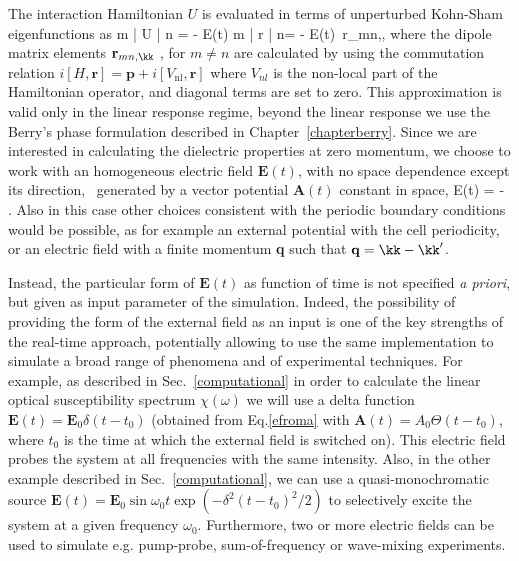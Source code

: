 The interaction Hamiltonian $U$ is evaluated in terms of
unperturbed Kohn-Sham eigenfunctions as
\be
\langle m \kk | U | n \kk \rangle = - \mathbf E(t) \langle m \kk | \mathbf r |
n\kk \rangle =  - \mathbf E(t)\,  \mathbf r_{mn,\kk},
\label{u_expantion}
\ee
where the dipole matrix elements $\mathbf r_{mn,\kk}$ , for $m \neq n$ are calculated by using the
commutation relation $i[H,\mathbf r] = \mathbf p + i[V_{\text{nl}},\mathbf
  r]$ where $V_{nl}$ is the non-local part of the Hamiltonian operator, and diagonal terms are set to zero.
  This approximation is valid only in the linear response regime, beyond the linear response we use the Berry's
  phase formulation described in Chapter~\ref{chapterberry}.
Since we are interested in calculating the dielectric properties at
zero momentum, we choose to work with an homogeneous electric
field $\mathbf E(t)$, with no space dependence
except its direction,~\cite{PhysRevB.62.7998} generated by a vector potential $\mathbf A(t)$ constant in space, 
\be
\mathbf E(t) = - .
\label{efroma}
\ee
Also in this case other choices consistent with the periodic boundary
conditions would be possible, as for example an external potential
with the cell periodicity,\cite{PhysRevLett.87.036401} or an electric
field  with a finite momentum\cite{PhysRevLett.84.1768} {\bf q} such
that $\mathbf q = \kk-\kk'$. 

Instead, the particular form of $\mathbf E(t)$ as function of time is not
specified \emph{a priori}, but given as input parameter of the simulation.
Indeed, the possibility of providing the form of the external
field as an input is one of the key strengths of the real-time approach,
potentially allowing to use the same implementation to simulate a
broad range of phenomena and of experimental techniques.  
For example, as described in Sec.~\ref{computational}
in order to calculate the linear optical susceptibility spectrum
$\chi(\omega)$ we will use a delta function ${\mathbf E(t)} = {\mathbf
  E}_0 \delta(t-t_0)$ (obtained from Eq.\eqref{efroma} with $\mathbf A(t) = A_0\Theta(t-t_0) $, where $t_0$ is the time at
which the external field is switched on). This electric field probes the system at
all frequencies with the same intensity. Also, in the other example described
in Sec.~\ref{computational},  we can use a quasi-monochromatic source
${\mathbf E(t)} = {\mathbf E}_0 \sin{\omega_0 t}\exp{(-\delta^2(t-t_0)^2/2)}$ to selectively excite
the system at a given frequency $\omega_0$.  Furthermore, two or more electric
fields can be used to simulate e.g. pump-probe, sum-of-frequency or wave-mixing
experiments.


